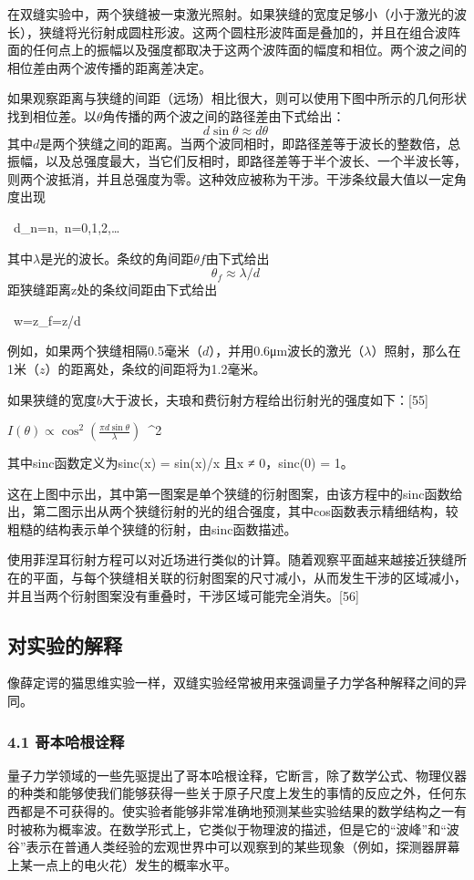 在双缝实验中，两个狭缝被一束激光照射。如果狭缝的宽度足够小（小于激光的波长），狭缝将光衍射成圆柱形波。这两个圆柱形波阵面是叠加的，并且在组合波阵面的任何点上的振幅以及强度都取决于这两个波阵面的幅度和相位。两个波之间的相位差由两个波传播的距离差决定。

如果观察距离与狭缝的间距（远场）相比很大，则可以使用下图中所示的几何形状找到相位差。以$\theta$角传播的两个波之间的路径差由下式给出：
$$d \sin\theta\approx d\theta~$$
其中$d$是两个狭缝之间的距离。当两个波同相时，即路径差等于波长的整数倍，总振幅，以及总强度最大，当它们反相时，即路径差等于半个波长、一个半波长等，则两个波抵消，并且总强度为零。这种效应被称为干涉。干涉条纹最大值以一定角度出现

~d\theta_{n}=n\lambda,~n=0,1,2,\ldots

其中$\lambda$是光的波长。条纹的角间距$\theta f$由下式给出
$$\theta_f\approx \lambda/d~$$
距狭缝距离z处的条纹间距由下式给出

~w=z\theta_{f}=z\lambda/d

例如，如果两个狭缝相隔0.5毫米（$d$），并用0.6μm波长的激光（$\lambda$）照射，那么在1米（$z$）的距离处，条纹的间距将为1.2毫米。

如果狭缝的宽度$b$大于波长，夫琅和费衍射方程给出衍射光的强度如下：[55]

$I(\theta) \propto \cos^2 \left( \frac{\pi d \sin \theta}{\lambda} \right)$~^{2}

其中sinc函数定义为sinc(x) = sin(x)/x 且x ≠ 0，sinc(0) = 1。

这在上图中示出，其中第一图案是单个狭缝的衍射图案，由该方程中的sinc函数给出，第二图示出从两个狭缝衍射的光的组合强度，其中cos函数表示精细结构，较粗糙的结构表示单个狭缝的衍射，由sinc函数描述。

使用菲涅耳衍射方程可以对近场进行类似的计算。随着观察平面越来越接近狭缝所在的平面，与每个狭缝相关联的衍射图案的尺寸减小，从而发生干涉的区域减小，并且当两个衍射图案没有重叠时，干涉区域可能完全消失。[56]

\subsection{对实验的解释}
像薛定谔的猫思维实验一样，双缝实验经常被用来强调量子力学各种解释之间的异同。
\subsubsection{4.1 哥本哈根诠释}
量子力学领域的一些先驱提出了哥本哈根诠释，它断言，除了数学公式、物理仪器的种类和能够使我们能够获得一些关于原子尺度上发生的事情的反应之外，任何东西都是不可获得的。使实验者能够非常准确地预测某些实验结果的数学结构之一有时被称为概率波。在数学形式上，它类似于物理波的描述，但是它的“波峰”和“波谷”表示在普通人类经验的宏观世界中可以观察到的某些现象（例如，探测器屏幕上某一点上的电火花）发生的概率水平。

